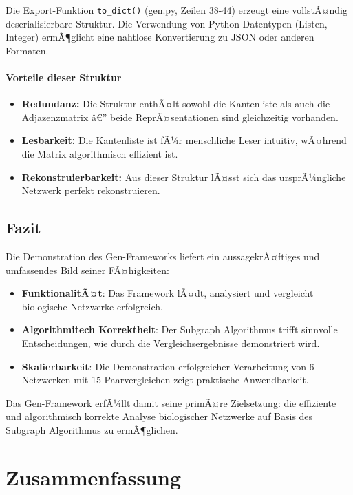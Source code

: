 ﻿\documentclass[a4paper,12pt]{article}
\theoremstyle{definition}
\begin{document}
Die Export-Funktion \texttt{to\_dict()} (gen.py, Zeilen 38-44) erzeugt eine vollstÃ¤ndig deserialisierbare Struktur. Die Verwendung von Python-Datentypen (Listen, Integer) ermÃ¶glicht eine nahtlose Konvertierung zu JSON oder anderen Formaten.

\paragraph{Vorteile dieser Struktur}
\begin{itemize}
\item[-] \textbf{Redundanz:} Die Struktur enthÃ¤lt sowohl die Kantenliste als auch die Adjazenzmatrix â€” beide ReprÃ¤sentationen sind gleichzeitig vorhanden.
\item[-] \textbf{Lesbarkeit:} Die Kantenliste ist fÃ¼r menschliche Leser intuitiv, wÃ¤hrend die Matrix algorithmisch effizient ist.
\item[-] \textbf{Rekonstruierbarkeit:} Aus dieser Struktur lÃ¤sst sich das ursprÃ¼ngliche Netzwerk perfekt rekonstruieren.
\end{itemize}

\subsection{Fazit}

Die Demonstration des Gen-Frameworks liefert ein aussagekrÃ¤ftiges und umfassendes Bild seiner FÃ¤higkeiten:

\begin{itemize}
\item[-] \textbf{FunktionalitÃ¤t}: Das Framework lÃ¤dt, analysiert und vergleicht biologische Netzwerke erfolgreich.
\item[-] \textbf{Algorithmitech Korrektheit}: Der Subgraph Algorithmus trifft sinnvolle Entscheidungen, wie durch die Vergleichsergebnisse demonstriert wird.
\item[-] \textbf{Skalierbarkeit}: Die Demonstration erfolgreicher Verarbeitung von 6 Netzwerken mit 15 Paarvergleichen zeigt praktische Anwendbarkeit.
\end{itemize}

Das Gen-Framework erfÃ¼llt damit seine primÃ¤re Zielsetzung: die effiziente und algorithmisch korrekte Analyse biologischer Netzwerke auf Basis des Subgraph Algorithmus zu ermÃ¶glichen.

\section{Zusammenfassung}
\end{document}
